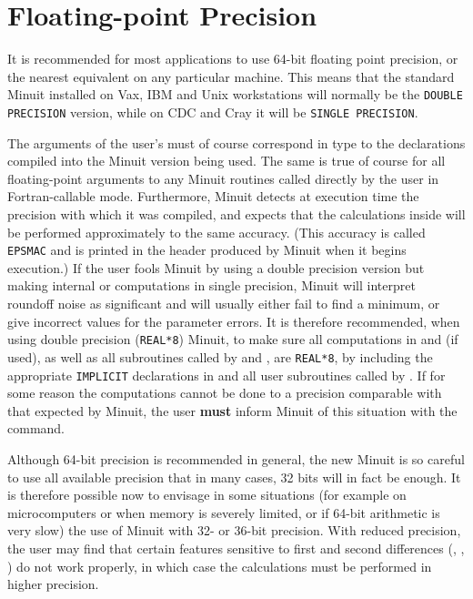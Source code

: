 \section{Floating-point Precision}

It is recommended for most applications to use 64-bit floating point
precision, or the nearest equivalent on any particular machine.
This means that the standard Minuit installed on Vax, IBM
and Unix workstations will normally be the \texttt{DOUBLE PRECISION} version, 
while on CDC and Cray it will be \texttt{SINGLE PRECISION}.
 
The arguments of the
user's  must of course correspond in type to the declarations
compiled into the Minuit version being used.
The same is true of course for all floating-point arguments
to any Minuit routines called directly by the user in
Fortran-callable mode.
Furthermore, Minuit detects at execution time the precision
with which it was compiled, and expects that the calculations inside
 will be performed approximately to the same accuracy.
(This accuracy is called \texttt{EPSMAC} and is printed in the header produced
by Minuit when it begins execution.)
If the user fools Minuit by using a double precision version but
making internal  or 
computations in single precision, Minuit will
interpret roundoff noise as significant and will usually either fail
to find a minimum, or give incorrect values for the parameter errors.
It is therefore recommended, when using
double precision (\texttt{REAL*8}) Minuit, to make sure all computations
in  and  (if used), as well as all subroutines called
by  and , are \texttt{REAL*8},
by including the appropriate \texttt{IMPLICIT} declarations in 
and all user subroutines called by .
If for some reason the computations cannot be done to a precision
comparable with that expected by Minuit, the user {\bf must} inform Minuit
of this situation with the  command.
 
Although 64-bit precision is recommended in general,
the new Minuit is so careful to use all available precision that in
many cases, 32 bits will in fact be enough.
It is therefore possible now to envisage in some situations
(for example on microcomputers or when memory is severely limited,
or if 64-bit arithmetic is very slow) the use of Minuit with
32- or 36-bit precision.
With reduced precision, the user may find that certain features
sensitive to first and second differences 
(, , )
do not work properly, in which case the calculations must be 
performed in higher precision.
